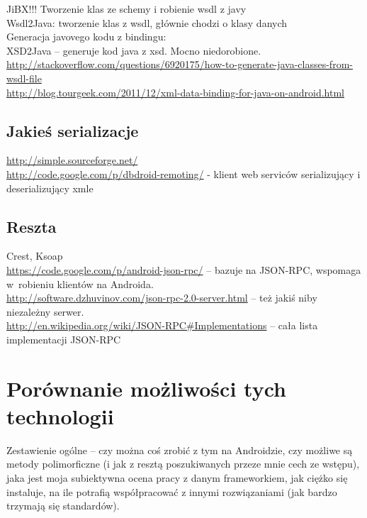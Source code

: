 JiBX!!! Tworzenie klas ze schemy i robienie wsdl z javy\\
Wsdl2Java: tworzenie klas z wsdl, głównie chodzi o klasy danych\\

Generacja javovego kodu z bindingu:\\
XSD2Java – generuje kod java z xsd. Mocno niedorobione.\\

\url{http://stackoverflow.com/questions/6920175/how-to-generate-java-classes-from-wsdl-file}\\
\url{http://blog.tourgeek.com/2011/12/xml-data-binding-for-java-on-android.html}\\

\subsection{Jakieś serializacje}
\url{http://simple.sourceforge.net/}\\
\url{http://code.google.com/p/dbdroid-remoting/} - klient web serviców serializujący i deserializujący xmle\\

\subsection{Reszta}
Crest, Ksoap \\
\url{https://code.google.com/p/android-json-rpc/} -- bazuje na JSON-RPC, wspomaga w~robieniu klientów na Androida.\\
\url{http://software.dzhuvinov.com/json-rpc-2.0-server.html} -- też jakiś niby niezależny serwer. \\ 
\url{http://en.wikipedia.org/wiki/JSON-RPC#Implementations} -- cała lista implementacji JSON-RPC



\section{Porównanie możliwości tych technologii}
Zestawienie ogólne -- czy można coś zrobić z tym na Androidzie, czy możliwe są metody polimorficzne (i jak z resztą poszukiwanych przeze mnie cech ze wstępu), jaka jest moja subiektywna ocena pracy z danym frameworkiem, jak ciężko się instaluje, na ile potrafią współpracować z innymi rozwiązaniami (jak bardzo trzymają się standardów).

